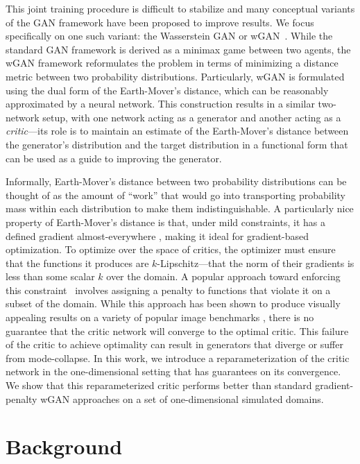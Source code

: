 \documentclass[letterpaper]{article} %
\begin{document}
This joint training procedure is difficult to stabilize and many conceptual variants of the GAN framework have been proposed to improve results. We focus specifically on one such variant: the Wasserstein GAN or wGAN~\cite{Arjovsky2017WassersteinG}. While the standard GAN framework is derived as a minimax game between two agents, the wGAN framework reformulates the problem in terms of minimizing a distance metric between two probability distributions. Particularly, wGAN is formulated using the dual form of the Earth-Mover's distance, which can be reasonably approximated by a neural network. This construction results in a similar two-network setup, with one network acting as a generator and another acting as a \emph{critic}---its role is to maintain an estimate of the Earth-Mover's distance between the generator's distribution and the target distribution in a functional form that can be used as a guide to improving the generator.

Informally, Earth-Mover's distance between two probability distributions can be thought of as the amount of ``work'' that would go into transporting probability mass within each distribution to make them indistinguishable. A particularly nice property of Earth-Mover's distance is that, under mild constraints, it has a defined gradient almost-everywhere \cite{Arjovsky2017WassersteinG}, making it ideal for gradient-based optimization. To optimize over the space of critics, the optimizer must ensure that the functions it produces are $k$-Lipschitz---that the norm of their gradients is less than some scalar $k$ over the domain. A popular approach toward enforcing this constraint~\cite{Gulrajani2017ImprovedTO} involves assigning a penalty to functions that violate it on a subset of the domain. While this approach has been shown to produce visually appealing results on a variety of popular image benchmarks \cite{Gulrajani2017ImprovedTO}, there is no guarantee that the critic network will converge to the optimal critic. This failure of the critic to achieve optimality can result in generators that diverge or suffer from mode-collapse. In this work, we introduce a reparameterization of the critic network in the one-dimensional setting that has guarantees on its convergence. We show that this reparameterized critic performs better than standard gradient-penalty wGAN approaches on a set of one-dimensional simulated domains.


\section{Background}
\end{document}
